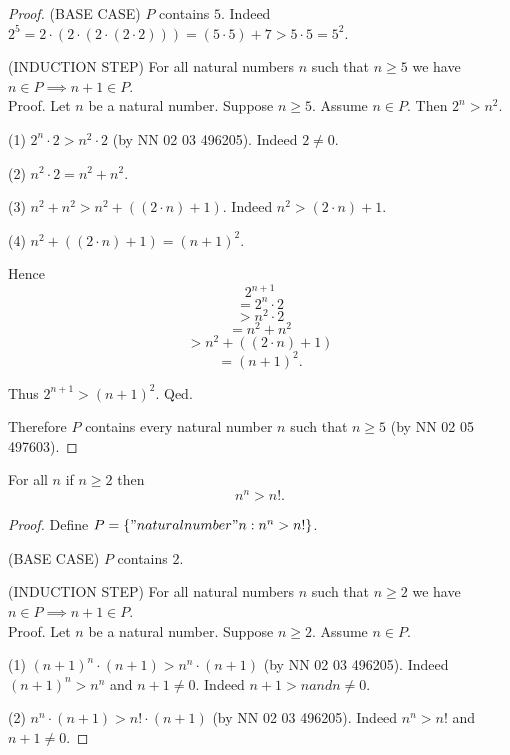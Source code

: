\documentclass[../../natural-numbers.ftl.tex]{subfiles}
\begin{document}
\begin{forthel}
\begin{proof}
      (BASE CASE) $P$ contains $5$.
      Indeed $2^{5} = 2 \cdot (2 \cdot (2 \cdot (2 \cdot 2))) = (5 \cdot 5) + 7 > 5 \cdot 5 = 5^{2}$.

      (INDUCTION STEP) For all natural numbers $n$ such that $n \geq 5$ we have $n \in P \implies n + 1 \in P$. \\
      Proof.
        Let $n$ be a natural number.
        Suppose $n \geq 5$.
        Assume $n \in P$.
        Then $2^{n} > n^{2}$.

        (1) $2^{n} \cdot 2 > n^{2} \cdot 2$ (by NN 02 03 496205).
        Indeed $2 \neq 0$.

        (2) $n^{2} \cdot 2 = n^{2} + n^{2}$.

        (3) $n^{2} + n^{2} > n^{2} + ((2 \cdot n) + 1)$.
        Indeed $n^{2} > (2 \cdot n) + 1$.

        (4) $n^{2} + ((2 \cdot n) + 1) = (n + 1)^{2}$.

        Hence
        $$  2^{n + 1}$$
        $$= 2^{n} \cdot 2$$
        $$> n^{2} \cdot 2$$
        $$= n^{2} + n^{2}$$
        $$> n^{2} + ((2 \cdot n) + 1)$$
        $$= (n + 1)^{2}.$$

        Thus $2^{n + 1} > (n + 1)^{2}$.
      Qed.

      Therefore $P$ contains every natural number $n$ such that $n \geq 5$ (by NN 02 05 497603).
    \end{proof}


    \begin{proposition}[NN 02 06 527159]
      For all $n$ if $n \geq 2$ then
      $$n^{n} > n!.$$
    \end{proposition}
    \begin{proof}
      Define $P = \{ "natural number" n : n^{n} > n! \}$.

      (BASE CASE) $P$ contains $2$.

      (INDUCTION STEP) For all natural numbers $n$ such that $n \geq 2$ we have $n \in P \implies n + 1 \in P$. \\
      Proof.
        Let $n$ be a natural number.
        Suppose $n \geq 2$.
        Assume $n \in P$.

        (1) $(n + 1)^{n} \cdot (n + 1) > n^{n} \cdot (n + 1)$ (by NN 02 03 496205).
        Indeed $(n + 1)^{n} > n^{n}$ and $n + 1 \neq 0$.
        Indeed $n + 1 > n and n \neq 0$.

        (2) $n^{n} \cdot (n + 1) > n! \cdot (n + 1)$ (by NN 02 03 496205).
        Indeed $n^{n} > n!$ and $n + 1 \neq 0$.


\end{proof}
\end{forthel}
\end{document}
